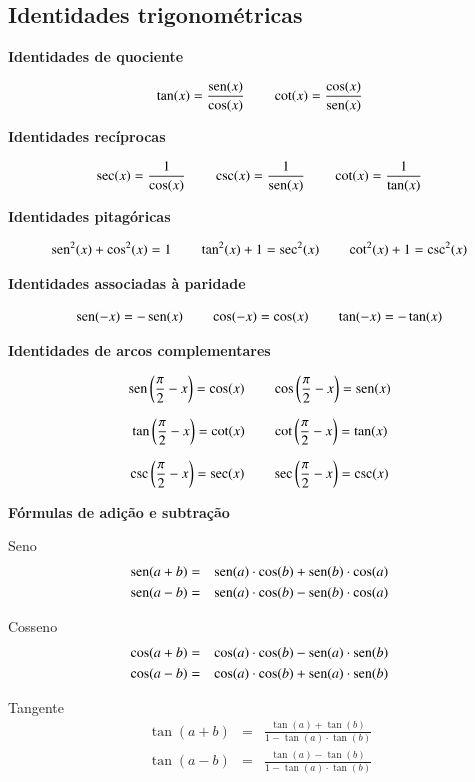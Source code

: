  \newpage

 \subsection{Identidades trigonométricas}

 \textbf{Identidades de quociente}

 \[\tan(x)= \dfrac{\operatorname{sen}(x)}{\cos(x)} \qquad \operatorname{cot}(x)= \dfrac{\cos(x)}{\operatorname{sen}(x)}\]

 \vskip0.5cm
 \textbf{Identidades recíprocas}

 \[\sec(x)= \dfrac{1}{\cos(x)} \qquad
   \csc(x)= \dfrac{1}{\operatorname{sen}(x)} \qquad
   \operatorname{cot}(x)= \dfrac{1}{\tan(x)}\]

 \vskip0.5cm
 \textbf{Identidades pitagóricas}

 \[\operatorname{sen}^2(x) + \cos^2(x)= 1 \qquad
   \tan^2(x)+ 1= \sec^2(x) \qquad
   \operatorname{cot}^2(x)+1=\operatorname{csc}^2(x)\]

 \vskip0.5cm
 \textbf{Identidades associadas à paridade}

 \[\operatorname{sen}(-x)= -\operatorname{sen}(x) \qquad \cos(-x)= \cos(x) \qquad \tan(-x)=-\tan(x)\]

 \vskip0.5cm
 \textbf{Identidades de arcos complementares}

 \[\operatorname{sen} \left(\frac{\pi}{2} - x \right)= \cos(x) \qquad
   \cos \left(\frac{\pi}{2} - x \right)= \operatorname{sen}(x)\]

 \[\tan \left(\frac{\pi}{2} - x \right)= \operatorname{cot}(x) \qquad
   \operatorname{cot} \left(\frac{\pi}{2} - x \right)= \tan(x)\]

 \[\operatorname{csc} \left(\frac{\pi}{2} - x \right)= \sec(x) \qquad
   \sec \left(\frac{\pi}{2} - x \right)= \operatorname{csc}(x)\]


\vskip0.5cm
 \textbf{Fórmulas de adição e subtração}

 Seno
 \begin{eqnarray*}
  \operatorname{sen}(a+b)&=&\operatorname{sen}(a)\cdot \cos(b)+\operatorname{sen}(b)\cdot \cos(a) \\
  \operatorname{sen}(a-b)&=&\operatorname{sen}(a)\cdot \cos(b)-\operatorname{sen}(b)\cdot \cos(a)
 \end{eqnarray*}

 Cosseno
 \begin{eqnarray*}
  \cos(a+b)&=&\cos(a)\cdot \cos(b)-\operatorname{sen}(a)\cdot \operatorname{sen}(b) \\
  \cos(a-b)&=&\cos(a)\cdot \cos(b)+\operatorname{sen}(a)\cdot \operatorname{sen}(b)
 \end{eqnarray*}

 Tangente
 \begin{eqnarray*}
  \tan(a+b)&=& \frac{\tan(a)+\tan(b)}{1-\tan(a)\cdot \tan(b)} \\
  \tan(a-b)&=& \frac{\tan(a)-\tan(b)}{1-\tan(a)\cdot \tan(b)}
 \end{eqnarray*}


